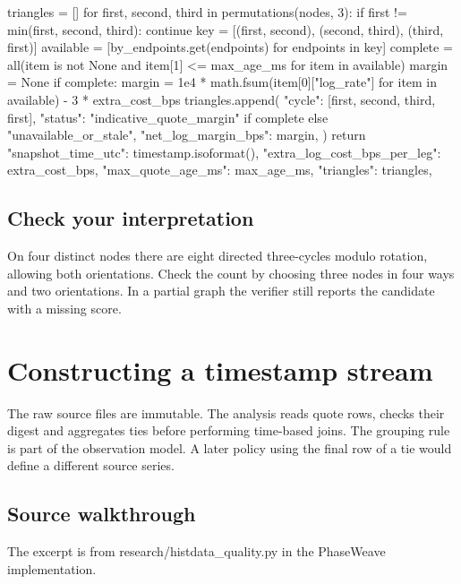 \documentclass[11pt,oneside,openany]{book}
\begin{document}
\begin{BookCode}
    triangles = []
    for first, second, third in permutations(nodes, 3):
        if first != min(first, second, third):
            continue
        key = [(first, second), (second, third), (third, first)]
        available = [by_endpoints.get(endpoints) for endpoints in key]
        complete = all(item is not None and item[1] <= max_age_ms for item in available)
        margin = None
        if complete:
            margin = 1e4 * math.fsum(item[0]["log_rate"] for item in available) - 3 * extra_cost_bps
        triangles.append({
            "cycle": [first, second, third, first],
            "status": "indicative_quote_margin" if complete else "unavailable_or_stale",
            "net_log_margin_bps": margin,
        })
    return {
        "snapshot_time_utc": timestamp.isoformat(), "extra_log_cost_bps_per_leg": extra_cost_bps,
        "max_quote_age_ms": max_age_ms, "triangles": triangles,
    }
\end{BookCode}
\section*{Check your interpretation}
On four distinct nodes there are eight directed three-cycles modulo rotation, allowing both orientations. Check the count by choosing three nodes in four ways and two orientations. In a partial graph the verifier still reports the candidate with a missing score.

\chapter{Constructing a timestamp stream}
The raw source files are immutable. The analysis reads quote rows, checks their digest and aggregates ties before performing time-based joins. The grouping rule is part of the observation model. A later policy using the final row of a tie would define a different source series.

\section*{Source walkthrough}
The excerpt is from research/histdata\_quality.py in the PhaseWeave implementation.
\end{document}
